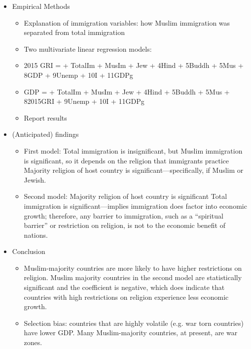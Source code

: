 \documentclass{article}
\begin{document}
\begin{itemize}
\begin{itemize}
    \end{itemize}
\item Empirical Methods
    \begin{itemize}
    \item Explanation of immigration variables: how Muslim immigration was separated from total immigration
\item Two multivariate linear regression models:
\item 2015 GRI =  +  TotalIm +  MusIm +  Jew + \beta4Hind + \beta5Buddh + \beta5Mus + \beta8GDP + \beta9Unemp + \beta10I + \beta11GDPg

\item GDP =  +  TotalIm +  MusIm +  Jew + \beta4Hind + \beta5Buddh + \beta5Mus + \beta82015GRI + \beta9Unemp + \beta10I + \beta11GDPg
\item Report results

    \end{itemize}
\item (Anticipated) findings
    \begin{itemize}
    \item First model:
Total immigration is insignificant, but Muslim immigration is significant, so it depends on the religion that immigrants practice
Majority religion of host country is significant—specifically, if Muslim or Jewish.
\item Second model:
 Majority religion of host country is significant
Total immigration is significant—implies immigration does factor into economic growth; therefore, any barrier to immigration, such as a “spiritual barrier” or restriction on religion, is not to the economic benefit of nations.
    \end{itemize}
\item Conclusion
    \begin{itemize}
    \item Muslim-majority countries are more likely to have higher restrictions on religion. Muslim majority countries in the second model are statistically significant and the coefficient is negative, which does indicate that countries with high restrictions on religion experience less economic growth.
\item Selection bias: countries that are highly volatile (e.g. war torn countries) have lower GDP. Many Muslim-majority countries, at present, are war zones. 

    \end{itemize}
\end{itemize}


\nocite{*}

\end{document}
